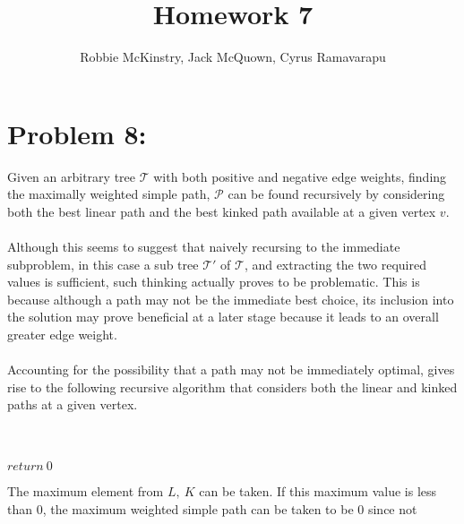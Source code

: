 \documentclass[12pt]{article}
\begin{document}
\title{Homework 7}
\author{Robbie McKinstry, Jack McQuown, Cyrus Ramavarapu}
\renewcommand{\today}{19 September 2016}
\renewcommand{\baselinestretch}{1.5}
\maketitle

\section*{Problem 8: }
Given an arbitrary tree $\mathcal{T}$ with both positive and negative
edge weights, finding the maximally weighted simple path, $\mathcal{P}$
can be found recursively by considering both the best linear path 
and the best kinked path available at a given vertex $v$.\\\\
Although this seems to suggest that naively recursing to the immediate
subproblem, in this case a sub tree $\mathcal{T'}$ of $\mathcal{T}$, and
extracting the two required values is sufficient, such thinking actually
proves to be problematic.  This is because although a path may not
be the immediate best choice, its inclusion into the solution may prove
beneficial at a later stage because it leads to an overall greater 
edge weight.\\\\
Accounting for the possibility that a path may not be immediately optimal,
gives rise to the following recursive algorithm that considers both the 
linear and kinked paths at a given vertex.\\
\begin{algorithm}[H]
\\
\\
{$return\ 0$}
\end{algorithm}
The maximum element from $L,\ K$ can be taken.  If this maximum value is less
than $0$, the maximum weighted simple path can be taken to be $0$ since not
\end{document}
